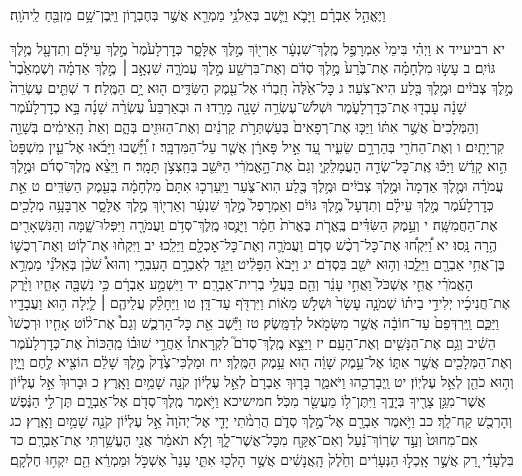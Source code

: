 \documentclass[twoside, openany, parskip=half, 11pt]{book}
\begin{document}
וַיֶּאֱהַ֣ל אַבְרָ֗ם וַיָּבֹ֛א וַיֵּ֛שֶׁב בְּאֵלֹנֵ֥י מַמְרֵ֖א אֲשֶׁ֣ר בְּחֶבְר֑וֹן וַיִּֽבֶן־שָׁ֥ם מִזְבֵּ֖חַ לַֽיהֹוָֽה׃

יא רביעייד א וַיְהִ֗י בִּימֵי֙ אַמְרָפֶ֣ל מֶֽלֶךְ־שִׁנְעָ֔ר אַרְי֖וֹךְ מֶ֣לֶךְ אֶלָּסָ֑ר כְּדׇרְלָעֹ֙מֶר֙ מֶ֣לֶךְ עֵילָ֔ם וְתִדְעָ֖ל מֶ֥לֶךְ גּוֹיִֽם׃ ב עָשׂ֣וּ מִלְחָמָ֗ה אֶת־בֶּ֙רַע֙ מֶ֣לֶךְ סְדֹ֔ם וְאֶת־בִּרְשַׁ֖ע מֶ֣לֶךְ עֲמֹרָ֑ה שִׁנְאָ֣ב ׀ מֶ֣לֶךְ אַדְמָ֗ה וְשֶׁמְאֵ֙בֶר֙ מֶ֣לֶךְ צְבֹיִ֔ים וּמֶ֥לֶךְ בֶּ֖לַע הִיא־צֹֽעַר׃ ג כׇּל־אֵ֙לֶּה֙ חָֽבְר֔וּ אֶל־עֵ֖מֶק הַשִּׂדִּ֑ים ה֖וּא יָ֥ם הַמֶּֽלַח׃ ד שְׁתֵּ֤ים עֶשְׂרֵה֙ שָׁנָ֔ה עָבְד֖וּ אֶת־כְּדׇרְלָעֹ֑מֶר וּשְׁלֹשׁ־עֶשְׂרֵ֥ה שָׁנָ֖ה מָרָֽדוּ׃ ה וּבְאַרְבַּע֩ עֶשְׂרֵ֨ה שָׁנָ֜ה בָּ֣א כְדׇרְלָעֹ֗מֶר וְהַמְּלָכִים֙ אֲשֶׁ֣ר אִתּ֔וֹ וַיַּכּ֤וּ אֶת־רְפָאִים֙ בְּעַשְׁתְּרֹ֣ת קַרְנַ֔יִם וְאֶת־הַזּוּזִ֖ים בְּהָ֑ם וְאֵת֙ הָֽאֵימִ֔ים בְּשָׁוֵ֖ה קִרְיָתָֽיִם׃ ו וְאֶת־הַחֹרִ֖י בְּהַרְרָ֣ם שֵׂעִ֑יר עַ֚ד אֵ֣יל פָּארָ֔ן אֲשֶׁ֖ר עַל־הַמִּדְבָּֽר׃ ז וַ֠יָּשֻׁ֠בוּ וַיָּבֹ֜אוּ אֶל־עֵ֤ין מִשְׁפָּט֙ הִ֣וא קָדֵ֔שׁ וַיַּכּ֕וּ אֶֽת־כׇּל־שְׂדֵ֖ה הָעֲמָלֵקִ֑י וְגַם֙ אֶת־הָ֣אֱמֹרִ֔י הַיֹּשֵׁ֖ב בְּחַֽצְצֹ֥ן תָּמָֽר׃ ח וַיֵּצֵ֨א מֶֽלֶךְ־סְדֹ֜ם וּמֶ֣לֶךְ עֲמֹרָ֗ה וּמֶ֤לֶךְ אַדְמָה֙ וּמֶ֣לֶךְ צְבֹיִ֔ים וּמֶ֥לֶךְ בֶּ֖לַע הִוא־צֹ֑עַר וַיַּֽעַרְכ֤וּ אִתָּם֙ מִלְחָמָ֔ה בְּעֵ֖מֶק הַשִּׂדִּֽים׃ ט אֵ֣ת כְּדׇרְלָעֹ֜מֶר מֶ֣לֶךְ עֵילָ֗ם וְתִדְעָל֙ מֶ֣לֶךְ גּוֹיִ֔ם וְאַמְרָפֶל֙ מֶ֣לֶךְ שִׁנְעָ֔ר וְאַרְי֖וֹךְ מֶ֣לֶךְ אֶלָּסָ֑ר אַרְבָּעָ֥ה מְלָכִ֖ים אֶת־הַחֲמִשָּֽׁה׃ י וְעֵ֣מֶק הַשִּׂדִּ֗ים בֶּֽאֱרֹ֤ת בֶּאֱרֹת֙ חֵמָ֔ר וַיָּנֻ֛סוּ מֶֽלֶךְ־סְדֹ֥ם וַעֲמֹרָ֖ה וַיִּפְּלוּ־שָׁ֑מָּה וְהַנִּשְׁאָרִ֖ים הֶ֥רָה נָּֽסוּ׃ יא וַ֠יִּקְח֠וּ אֶת־כׇּל־רְכֻ֨שׁ סְדֹ֧ם וַעֲמֹרָ֛ה וְאֶת־כׇּל־אׇכְלָ֖ם וַיֵּלֵֽכוּ׃ יב וַיִּקְח֨וּ אֶת־ל֧וֹט וְאֶת־רְכֻשׁ֛וֹ בֶּן־אֲחִ֥י אַבְרָ֖ם וַיֵּלֵ֑כוּ וְה֥וּא יֹשֵׁ֖ב בִּסְדֹֽם׃ יג וַיָּבֹא֙ הַפָּלִ֔יט וַיַּגֵּ֖ד לְאַבְרָ֣ם הָעִבְרִ֑י וְהוּא֩ שֹׁכֵ֨ן בְּאֵֽלֹנֵ֜י מַמְרֵ֣א הָאֱמֹרִ֗י אֲחִ֤י אֶשְׁכֹּל֙ וַאֲחִ֣י עָנֵ֔ר וְהֵ֖ם בַּעֲלֵ֥י בְרִית־אַבְרָֽם׃ יד וַיִּשְׁמַ֣ע אַבְרָ֔ם כִּ֥י נִשְׁבָּ֖ה אָחִ֑יו וַיָּ֨רֶק אֶת־חֲנִיכָ֜יו יְלִידֵ֣י בֵית֗וֹ שְׁמֹנָ֤ה עָשָׂר֙ וּשְׁלֹ֣שׁ מֵא֔וֹת וַיִּרְדֹּ֖ף עַד־דָּֽן׃ טו וַיֵּחָלֵ֨ק עֲלֵיהֶ֧ם ׀ לַ֛יְלָה ה֥וּא וַעֲבָדָ֖יו וַיַּכֵּ֑ם וַֽיִּרְדְּפֵם֙ עַד־חוֹבָ֔ה אֲשֶׁ֥ר מִשְּׂמֹ֖אל לְדַמָּֽשֶׂק׃ טז וַיָּ֕שֶׁב אֵ֖ת כׇּל־הָרְכֻ֑שׁ וְגַם֩ אֶת־ל֨וֹט אָחִ֤יו וּרְכֻשׁוֹ֙ הֵשִׁ֔יב וְגַ֥ם אֶת־הַנָּשִׁ֖ים וְאֶת־הָעָֽם׃ יז וַיֵּצֵ֣א מֶֽלֶךְ־סְדֹם֮ לִקְרָאתוֹ֒ אַחֲרֵ֣י שׁוּב֗וֹ מֵֽהַכּוֹת֙ אֶת־כְּדׇרְלָעֹ֔מֶר וְאֶת־הַמְּלָכִ֖ים אֲשֶׁ֣ר אִתּ֑וֹ אֶל־עֵ֣מֶק שָׁוֵ֔ה ה֖וּא עֵ֥מֶק הַמֶּֽלֶךְ׃ יח וּמַלְכִּי־צֶ֙דֶק֙ מֶ֣לֶךְ שָׁלֵ֔ם הוֹצִ֖יא לֶ֣חֶם וָיָ֑יִן וְה֥וּא כֹהֵ֖ן לְאֵ֥ל עֶלְיֽוֹן׃ יט וַֽיְבָרְכֵ֖הוּ וַיֹּאמַ֑ר בָּר֤וּךְ אַבְרָם֙ לְאֵ֣ל עֶלְי֔וֹן קֹנֵ֖ה שָׁמַ֥יִם וָאָֽרֶץ׃ כ וּבָרוּךְ֙ אֵ֣ל עֶלְי֔וֹן אֲשֶׁר־מִגֵּ֥ן צָרֶ֖יךָ בְּיָדֶ֑ךָ וַיִּתֶּן־ל֥וֹ מַעֲשֵׂ֖ר מִכֹּֽל׃ חמישיכא וַיֹּ֥אמֶר מֶֽלֶךְ־סְדֹ֖ם אֶל־אַבְרָ֑ם תֶּן־לִ֣י הַנֶּ֔פֶשׁ וְהָרְכֻ֖שׁ קַֽח־לָֽךְ׃ כב וַיֹּ֥אמֶר אַבְרָ֖ם אֶל־מֶ֣לֶךְ סְדֹ֑ם הֲרִמֹ֨תִי יָדִ֤י אֶל־יְהֹוָה֙ אֵ֣ל עֶלְי֔וֹן קֹנֵ֖ה שָׁמַ֥יִם וָאָֽרֶץ׃ כג אִם־מִחוּט֙ וְעַ֣ד שְׂרֽוֹךְ־נַ֔עַל וְאִם־אֶקַּ֖ח מִכׇּל־אֲשֶׁר־לָ֑ךְ וְלֹ֣א תֹאמַ֔ר אֲנִ֖י הֶעֱשַׁ֥רְתִּי אֶת־אַבְרָֽם׃ כד בִּלְעָדַ֗י רַ֚ק אֲשֶׁ֣ר אָֽכְל֣וּ הַנְּעָרִ֔ים וְחֵ֙לֶק֙ הָֽאֲנָשִׁ֔ים אֲשֶׁ֥ר הָלְכ֖וּ אִתִּ֑י עָנֵר֙ אֶשְׁכֹּ֣ל וּמַמְרֵ֔א הֵ֖ם יִקְח֥וּ חֶלְקָֽם׃
\end{document}
